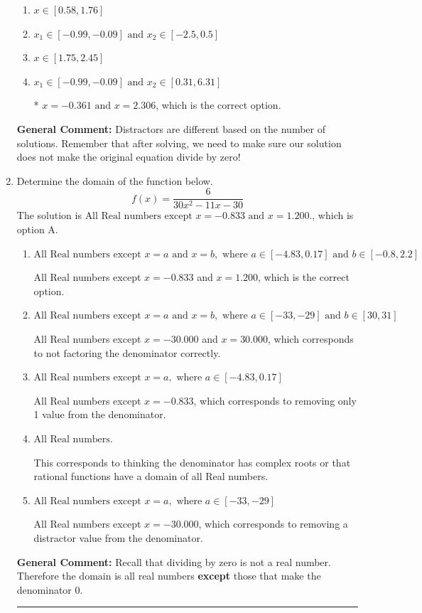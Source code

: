 \documentclass{extbook}[14pt]
\newcommand{\litem}[1]{\item #1

\rule{\textwidth}{0.4pt}}
\begin{document}
\begin{enumerate}
{\begin{enumerate}[label=\Alph*.]
\item \( x \in [0.58,1.76] \)


\item \( x_1 \in [-0.99, -0.09] \text{ and } x_2 \in [-2.5,0.5] \)


\item \( x \in [1.75,2.45] \)


\item \( x_1 \in [-0.99, -0.09] \text{ and } x_2 \in [0.31,6.31] \)

* $x = -0.361 \text{ and } x = 2.306$, which is the correct option.
\end{enumerate}

\textbf{General Comment:} Distractors are different based on the number of solutions. Remember that after solving, we need to make sure our solution does not make the original equation divide by zero!
}
\litem{
Determine the domain of the function below.
\[ f(x) = \frac{6}{30x^{2} -11 x -30} \]
The solution is \( \text{All Real numbers except } x = -0.833 \text{ and } x = 1.200. \), which is option A.\begin{enumerate}[label=\Alph*.]
\item \( \text{All Real numbers except } x = a \text{ and } x = b, \text{ where } a \in [-4.83, 0.17] \text{ and } b \in [-0.8, 2.2] \)

All Real numbers except $x = -0.833$ and $x = 1.200$, which is the correct option.
\item \( \text{All Real numbers except } x = a \text{ and } x = b, \text{ where } a \in [-33, -29] \text{ and } b \in [30, 31] \)

All Real numbers except $x = -30.000$ and $x = 30.000$, which corresponds to not factoring the denominator correctly.
\item \( \text{All Real numbers except } x = a, \text{ where } a \in [-4.83, 0.17] \)

All Real numbers except $x = -0.833$, which corresponds to removing only 1 value from the denominator.
\item \( \text{All Real numbers.} \)

This corresponds to thinking the denominator has complex roots or that rational functions have a domain of all Real numbers.
\item \( \text{All Real numbers except } x = a, \text{ where } a \in [-33, -29] \)

All Real numbers except $x = -30.000$, which corresponds to removing a distractor value from the denominator.
\end{enumerate}

\textbf{General Comment:} Recall that dividing by zero is not a real number. Therefore the domain is all real numbers \textbf{except} those that make the denominator 0.
}
\end{enumerate}
\end{document}
